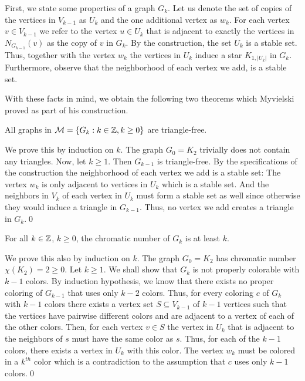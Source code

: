 First, we state some properties of a graph $G_k$. Let us denote the set of copies of the vertices in $V_{k-1}$ as $U_k$ and the one additional vertex as $w_k$. For each vertex $v\in V_{k-1}$ we refer to the vertex $u\in U_k$ that is adjacent to exactly the vertices in $N_{G_{k-1}}(v)$ as the copy of $v$ in $G_k$. By the construction, the set $U_k$ is a stable set. Thus, together with the vertex $w_k$ the vertices in $U_k$ induce a star $K_{1, \vert U_k\vert}$ in $G_k$. Furthermore, observe that the neighborhood of each vertex we add, is a stable set.

With these facts in mind, we obtain the following two theorems which Myvielski proved as part of his construction.

\begin{thm}\label{t2my}
All graphs in $\mathcal{M}=\{G_k:k\in\mathbb{Z}, k\geq 0\}$ are triangle-free.
\end{thm}
\begin{prf}
We prove this by induction on $k$. The graph $G_0=K_2$ trivially does not contain any triangles. Now, let $k\geq 1$. Then $G_{k-1}$ is triangle-free. By the specifications of the construction the neighborhood of each vertex we add is a stable set: The vertex $w_k$ is only adjacent to vertices in $U_k$ which is a stable set. And the neighbors in $V_k$ of each vertex in $U_k$ must form a stable set as well since otherwise they would induce a triangle in $G_{k-1}$. Thus, no vertex we add creates a triangle in $G_k$.\qed 
\end{prf}

\begin{thm}\label{t3my}
For all $k\in\mathbb{Z}$, $k\geq 0$, the chromatic number of $G_k$ is at least $k$.
\end{thm}
\begin{prf}
We prove this also by induction on $k$. The graph $G_0=K_2$ has chromatic number $\chi (K_2)=2 \geq 0$. Let $k\geq 1$. We shall show that $G_k$ is not properly colorable with $k-1$ colors. By induction hypothesis, we know that there exists no proper coloring of $G_{k-1}$ that uses only $k-2$ colors. Thus, for every coloring $c$ of $G_k$ with $k-1$ colors there exists a vertex set $S\subseteq V_{k-1}$ of $k-1$ vertices such that the vertices have pairwise different colors and are adjacent to a vertex of each of the other colors. Then, for each vertex $v\in S$ the vertex in $U_k$ that is adjacent to the neighbors of $s$ must have the same color as $s$. Thus, for each of the $k-1$ colors, there exists a vertex in $U_k$ with this color. The vertex $w_k$ must be colored in a $k^{th}$ color which is a contradiction to the assumption that $c$ uses only $k-1$ colors.\qed
\end{prf}

